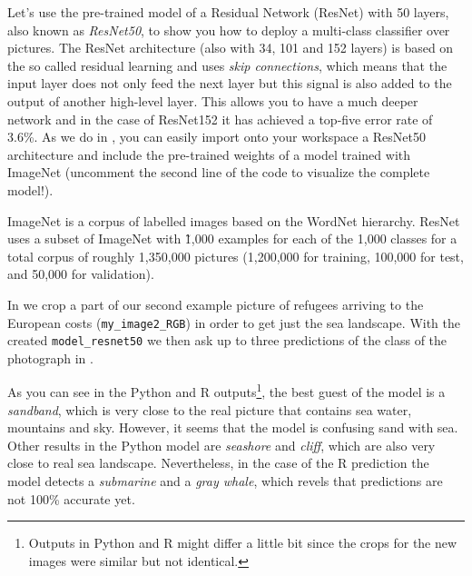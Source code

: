 Let's use the pre-trained model of a Residual Network (ResNet) with 50 layers, also known as \textit{ResNet50}, to show you how to deploy a multi-class classifier over pictures. The ResNet architecture (also with 34, 101 and 152 layers) is based on the so called residual learning and uses \textit{skip connections}, which means that the input layer does not only feed the next layer but this signal is also added to the output of another high-level layer. This allows you to have a much deeper network and in the case of ResNet152 it has achieved a top-five error rate of 3.6\%. As we do in , you can easily import onto your workspace a ResNet50 architecture and include the pre-trained weights of a model trained with ImageNet (uncomment the second line of the code to visualize the complete model!).


ImageNet is a corpus of labelled images based on the WordNet hierarchy. ResNet uses a subset of ImageNet with \~1,000 examples for each of the 1,000 classes for a total corpus of roughly 1,350,000 pictures (1,200,000 for training, 100,000 for test, and 50,000 for validation).

In  we crop a part of our second example picture of refugees arriving to the European costs (\texttt{my\_image2\_RGB}) in order to get just the sea landscape. With the created \texttt{model\_resnet50} we then ask up to three predictions of the class of the photograph in .



As you can see in the Python and R outputs\footnote{Outputs in Python and R might differ a little bit since the crops for the new images were similar but not identical.}, the best guest of the model is a \textit{sandband}, which is very close to the real picture that contains sea water, mountains and sky. However, it seems that the model is confusing sand with sea. Other results in the Python model are \textit{seashore} and \textit{cliff}, which are also very close to real sea landscape. Nevertheless, in the case of the R prediction the model detects a \textit{submarine} and a \textit{gray whale}, which revels that predictions are not 100\% accurate yet.

